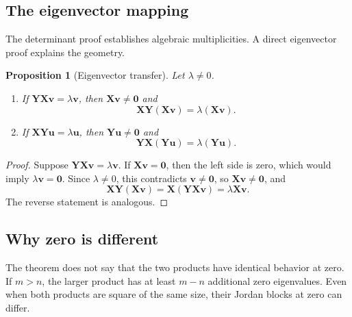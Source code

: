 \documentclass[11pt]{article}
\newcommand{\mat}[1]{\mathbf{#1}}
\newcommand{\vect}[1]{\mathbf{#1}}
\newtheorem{proposition}[proposition]{Proposition}
\theoremstyle{definition}
\theoremstyle{remark}
\begin{document}
\subsection{The eigenvector mapping}

The determinant proof establishes algebraic multiplicities. A direct eigenvector proof explains the geometry.

\begin{proposition}[Eigenvector transfer]
\label{prop:eigenvector-transfer}
Let \(\lambda\neq0\).
\begin{enumerate}[label=(\alph*)]
  \item If \(\mat{Y}\mat{X}\vect{v}=\lambda\vect{v}\), then
  \(\mat{X}\vect{v}\neq\vect{0}\) and
  \[
    \mat{X}\mat{Y}(\mat{X}\vect{v})
    =\lambda(\mat{X}\vect{v}).
  \]
  \item If \(\mat{X}\mat{Y}\vect{u}=\lambda\vect{u}\), then
  \(\mat{Y}\vect{u}\neq\vect{0}\) and
  \[
    \mat{Y}\mat{X}(\mat{Y}\vect{u})
    =\lambda(\mat{Y}\vect{u}).
  \]
\end{enumerate}
\end{proposition}

\begin{proof}
Suppose \(\mat{Y}\mat{X}\vect{v}=\lambda\vect{v}\). If
\(\mat{X}\vect{v}=\vect{0}\), then the left side is zero, which would imply \(\lambda\vect{v}=\vect{0}\). Since \(\lambda\neq0\), this contradicts \(\vect{v}\neq\vect{0}\), so \(\mat{X}\vect{v}\neq\vect{0}\), and
\[
  \mat{X}\mat{Y}(\mat{X}\vect{v})
  =\mat{X}(\mat{Y}\mat{X}\vect{v})
  =\lambda\mat{X}\vect{v}.
\]
The reverse statement is analogous.
\end{proof}

\subsection{Why zero is different}

The theorem does not say that the two products have identical behavior at zero. If \(m>n\), the larger product has at least \(m-n\) additional zero eigenvalues. Even when both products are square of the same size, their Jordan blocks at zero can differ.
\end{document}
